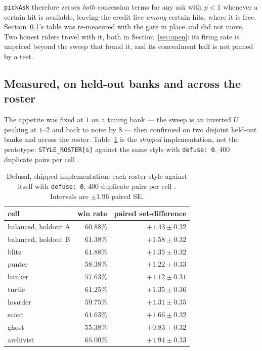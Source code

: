 \documentclass[11pt]{article}
\newcommand{\code}[1]{\texttt{#1}}
\begin{document}
\code{pickAsk} therefore zeroes \emph{both} concession terms for any ask with $p < 1$ whenever a
certain hit is available, leaving the credit live \emph{among} certain hits, where it is free.
Section~\ref{sec:shipped}'s table was re-measured with the gate in place and did not move. Two
honest riders travel with it, both in Section~\ref{sec:open}: its firing rate is unpriced beyond the
sweep that found it, and its concealment half is not pinned by a test.

\subsection{Measured, on held-out banks and across the roster}
\label{sec:shipped}

The appetite was fixed at $1$ on a tuning bank --- the sweep is an inverted $U$ peaking at $1$--$2$
and back to noise by $8$ --- then confirmed on two disjoint held-out banks and across the roster.
Table~\ref{tab:defuse} is the \emph{shipped} implementation, not the prototype:
\code{STYLE\_ROSTER[s]} against the same style with \code{defuse: 0}, 400 duplicate pairs per cell
\cite{concession}.

\begin{table}[t]
\centering
\caption{Defusal, shipped implementation: each roster style against itself with
\code{defuse: 0}, 400 duplicate pairs per cell \cite{concession}. Intervals are $\pm 1.96$ paired
SE.}
\label{tab:defuse}
\footnotesize
\begin{tabular}{@{}lrr@{}}
\toprule
cell & win rate & paired set-difference \\
\midrule
balanced, holdout A & $60.88\%$ & $\mathbf{+1.43 \pm 0.32}$ \\
balanced, holdout B & $61.38\%$ & $\mathbf{+1.58 \pm 0.32}$ \\
blitz     & $61.88\%$ & $+1.35 \pm 0.32$ \\
punter    & $58.38\%$ & $+1.22 \pm 0.33$ \\
banker    & $57.63\%$ & $+1.12 \pm 0.31$ \\
turtle    & $61.25\%$ & $+1.35 \pm 0.36$ \\
hoarder   & $59.75\%$ & $+1.31 \pm 0.35$ \\
scout     & $61.63\%$ & $+1.66 \pm 0.32$ \\
ghost     & $55.38\%$ & $+0.83 \pm 0.32$ \\
archivist & $\mathbf{65.00\%}$ & $\mathbf{+1.94 \pm 0.33}$ \\
\bottomrule
\end{tabular}
\end{table}
\end{document}
